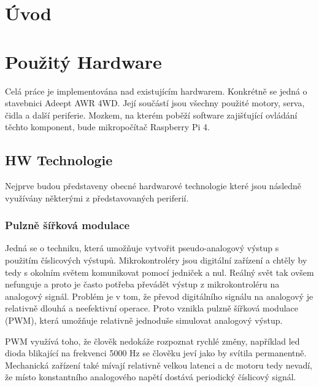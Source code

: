 
%

\chapter{Úvod}

\chapter{Použitý Hardware}
Celá práce je implementována nad existujícím hardwarem. Konkrétně se jedná o stavebnici Adeept AWR 4WD. Její součástí jsou všechny použité motory, serva, čidla a další periferie. Mozkem, na kterém poběží software zajišťující ovládání těchto komponent, bude mikropočítač Raspberry Pi 4.

\section{HW Technologie}
Nejprve budou představeny obecné hardwarové technologie které jsou následně využívány některými z představovaných periferií.

\subsection*{Pulzně šířková modulace}
Jedná se o techniku, která umožňuje vytvořit pseudo-analogový výstup s použitím číslicových výstupů. Mikrokontroléry jsou digitální zařízení a chtěly by tedy s okolním světem komunikovat pomocí jedniček a nul. Reálný svět tak ovšem nefunguje a proto je často potřeba převádět výstup z mikrokontroléru na analogový signál. Problém je v tom, že převod digitálního signálu na analogový je relativně dlouhá a neefektivní operace. Proto vznikla pulzně šířková modulace (PWM), která umožňuje relativně jednoduše simulovat analogový výstup. \cite{embeded_robotics}

PWM využívá toho, že člověk nedokáže rozpoznat rychlé změny, například led dioda blikající na frekvenci 5000 Hz se člověku jeví jako by svítila permanentně. Mechanická zařízení také mívají relativně velkou latenci a dc motoru tedy nevadí, že místo konstantního analogového napětí dostává periodický číslicový signál. \cite{embeded_robotics}

